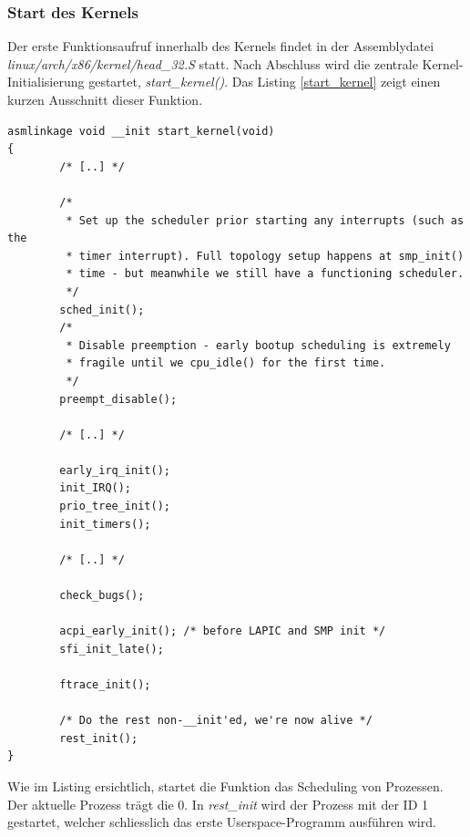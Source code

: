 \subsubsection{Start des Kernels}

Der erste Funktionsaufruf innerhalb des Kernels findet in der Assemblydatei \emph{linux/arch/x86/kernel/head\_32.S} statt.
Nach Abschluss wird die zentrale Kernel-Initialisierung gestartet, \emph{start\_kernel()}. Das Listing \ref{start_kernel} zeigt einen kurzen
Ausschnitt dieser Funktion.

\begin{lstlisting}[label=start_kernel,caption=linux/init/main.c]
asmlinkage void __init start_kernel(void)
{
        /* [..] */

        /*
         * Set up the scheduler prior starting any interrupts (such as the
         * timer interrupt). Full topology setup happens at smp_init()
         * time - but meanwhile we still have a functioning scheduler.
         */
        sched_init();
        /*
         * Disable preemption - early bootup scheduling is extremely
         * fragile until we cpu_idle() for the first time.
         */
        preempt_disable();

        /* [..] */

        early_irq_init();
        init_IRQ();
        prio_tree_init();
        init_timers();
 
        /* [..] */

        check_bugs();

        acpi_early_init(); /* before LAPIC and SMP init */
        sfi_init_late();

        ftrace_init();

        /* Do the rest non-__init'ed, we're now alive */
        rest_init();
}
\end{lstlisting}

Wie im Listing ersichtlich, startet die Funktion das Scheduling von Prozessen. Der aktuelle Prozess
trägt die  0. In \emph{rest\_init} wird der Prozess mit der ID 1 
gestartet, welcher schliesslich das erste Userspace-Programm ausführen wird.


